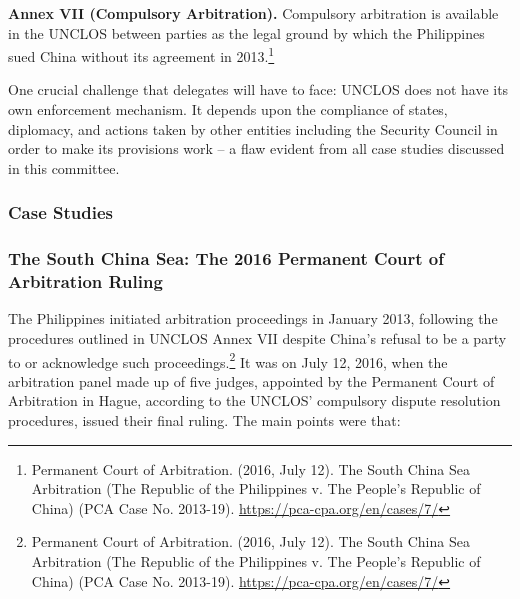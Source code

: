 \textbf{Annex VII (Compulsory Arbitration).} Compulsory arbitration is available in the UNCLOS between parties as the legal ground by which the Philippines sued China without its agreement in 2013.\footnote{Permanent Court of Arbitration. (2016, July 12). The South China Sea Arbitration (The Republic of the Philippines v. The People's Republic of China) (PCA Case No. 2013-19). \url{https://pca-cpa.org/en/cases/7/}}

One crucial challenge that delegates will have to face: UNCLOS does not have its own enforcement mechanism. It depends upon the compliance of states, diplomacy, and actions taken by other entities including the Security Council in order to make its provisions work – a flaw evident from all case studies discussed in this committee.

\subsubsection{Case Studies}

\subsubsection{The South China Sea: The 2016 Permanent Court of Arbitration Ruling}

The Philippines initiated arbitration proceedings in January 2013, following the procedures outlined in UNCLOS Annex VII despite China's refusal to be a party to or acknowledge such proceedings.\footnote{Permanent Court of Arbitration. (2016, July 12). The South China Sea Arbitration (The Republic of the Philippines v. The People's Republic of China) (PCA Case No. 2013-19). \url{https://pca-cpa.org/en/cases/7/}} It was on July 12, 2016, when the arbitration panel made up of five judges, appointed by the Permanent Court of Arbitration in Hague, according to the UNCLOS' compulsory dispute resolution procedures, issued their final ruling. The main points were that:

